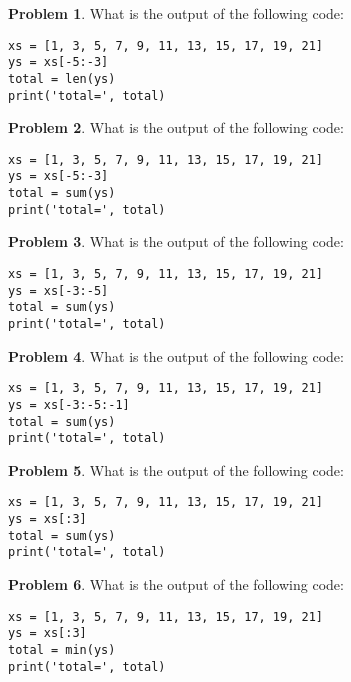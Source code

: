 \documentclass[10pt]{article}
\theoremstyle{definition}
\newtheorem{problem}{Problem}
\begin{document}
\begin{problem}
    What is the output of the following code:
\end{problem}
\begin{lstlisting}
xs = [1, 3, 5, 7, 9, 11, 13, 15, 17, 19, 21]
ys = xs[-5:-3]
total = len(ys)
print('total=', total)
\end{lstlisting}
\vspace{0.15in}

\begin{problem}
    What is the output of the following code:
\end{problem}
\begin{lstlisting}
xs = [1, 3, 5, 7, 9, 11, 13, 15, 17, 19, 21]
ys = xs[-5:-3]
total = sum(ys)
print('total=', total)
\end{lstlisting}
\vspace{0.15in}

\begin{problem}
    What is the output of the following code:
\end{problem}
\begin{lstlisting}
xs = [1, 3, 5, 7, 9, 11, 13, 15, 17, 19, 21]
ys = xs[-3:-5]
total = sum(ys)
print('total=', total)
\end{lstlisting}
\vspace{0.15in}

\begin{problem}
    What is the output of the following code:
\end{problem}
\begin{lstlisting}
xs = [1, 3, 5, 7, 9, 11, 13, 15, 17, 19, 21]
ys = xs[-3:-5:-1]
total = sum(ys)
print('total=', total)
\end{lstlisting}
\vspace{0.15in}

\begin{problem}
    What is the output of the following code:
\end{problem}
\begin{lstlisting}
xs = [1, 3, 5, 7, 9, 11, 13, 15, 17, 19, 21]
ys = xs[:3]
total = sum(ys)
print('total=', total)
\end{lstlisting}
\vspace{0.15in}

\begin{problem}
    What is the output of the following code:
\end{problem}
\begin{lstlisting}
xs = [1, 3, 5, 7, 9, 11, 13, 15, 17, 19, 21]
ys = xs[:3]
total = min(ys)
print('total=', total)
\end{lstlisting}
\vspace{0.15in}
\end{document}
